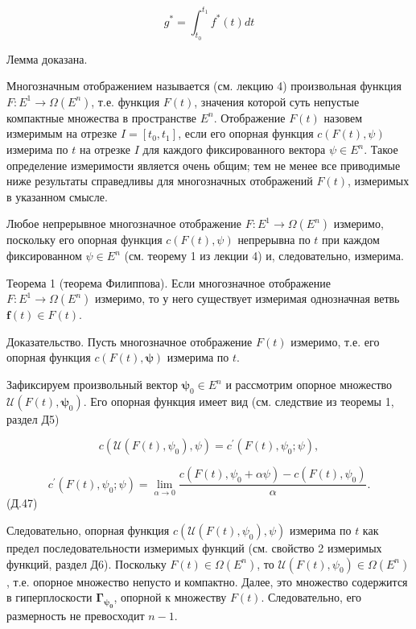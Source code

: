 \documentclass[8pt]{extarticle}
\begin{document}
\[
{g}^{ * } = {\int }_{{t}_{0}}^{{t}_{1}}{f}^{ * }\left( t\right) {dt}
\]

Лемма доказана.

\fi

Многозначным отображением называется (см. лекцию 4) произвольная функция \(F : {E}^{1} \rightarrow  \Omega \left( {E}^{n}\right)\), т.е. функция \(F\left( t\right)\), значения которой суть непустые компактные множества в пространстве \({E}^{n}\). Отображение \(F\left( t\right)\) назовем измеримым на отрезке \(I = \left\lbrack  {{t}_{0},{t}_{1}}\right\rbrack\), если его опорная функция \(c\left( {F\left( t\right) ,\psi }\right)\) измерима по \(t\) на отрезке \(I\) для каждого фиксированного вектора \(\psi \in {E}^{n}\). Такое определение измеримости является очень общим; тем не менее все приводимые ниже результаты справедливы для многозначных отображений \(F\left( t\right)\), измеримых в указанном смысле.

Любое непрерывное многозначное отображение \(F : {E}^{1} \rightarrow  \Omega \left( {E}^{n}\right)\) измеримо, поскольку его опорная функция \(c\left( {F\left( t\right) ,\psi }\right)\) непрерывна по \(t\) при каждом фиксированном \(\psi \in {E}^{n}\) (см. теорему 1 из лекции 4) и, следовательно, измерима.

Теорема 1 (теорема Филиппова). Если многозначное отображение \(F : {E}^{1} \rightarrow  \Omega \left( {E}^{n}\right)\) измеримо, то у него существует измеримая однозначная ветвь \(\mathbf{f}\left( t\right) \in F\left( t\right)\).

Доказательство. Пусть многозначное отображение \(F\left( t\right)\) измеримо, т.е. его опорная функция \(c\left( {F\left( t\right) ,\mathbf{\psi }}\right)\) измерима по \(t\).

Зафиксируем произвольный вектор \({\mathbf{\psi }}_{0} \in {E}^{n}\) и рассмотрим опорное множество \(\mathcal{U}\left( {F\left( t\right) ,{\mathbf{\psi }}_{0}}\right)\). Его опорная функция имеет вид (см. следствие из теоремы 1, раздел Д5)

\[
c\left( {\mathcal{U}\left( {F\left( t\right) ,{\psi }_{0}}\right) ,\psi }\right) = {c}^{\prime }\left( {F\left( t\right) ,{\psi }_{0};\psi }\right),
\]

\[
{c}^{\prime }\left( {F\left( t\right) ,{\psi }_{0};\psi }\right) = \mathop{\lim }\limits_{{\alpha \rightarrow 0}}\frac{c\left( {F\left( t\right) ,{\psi }_{0} + {\alpha \psi }}\right) - c\left( {F\left( t\right) ,{\psi }_{0}}\right)}{\alpha}.
\]
 (Д.47)

Следовательно, опорная функция \(c\left( {\mathcal{U}\left( {F\left( t\right) ,{\psi }_{0}}\right) ,\psi }\right)\) измерима по \(t\) как предел последовательности измеримых функций (см. свойство 2 измеримых функций, раздел Д6). Поскольку \(F\left( t\right) \in \Omega \left( {E}^{n}\right)\), то \(\mathcal{U}\left( {F\left( t\right) ,{\psi }_{0}}\right) \in \Omega \left( {E}^{n}\right)\), т.е. опорное множество непусто и компактно. Далее, это множество содержится в гиперплоскости \({\mathbf{\Gamma }}_{{\mathbf{\psi }}_{\mathbf{0}}}\), опорной к множеству \(F\left( t\right)\). Следовательно, его размерность не превосходит \(n - 1\).
\end{document}
